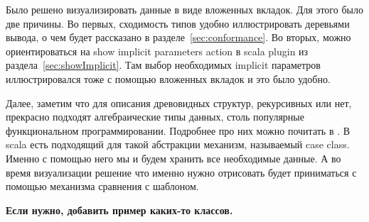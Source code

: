 Было решено визуализировать данные в виде вложенных вкладок.
Для этого было две причины.
Во первых, сходимость типов удобно иллюстрировать деревьями вывода,
о чем будет рассказано в разделе~\ref{sec:conformance}.
Во вторых, можно ориентироваться на show implicit parameters action
в scala plugin из раздела~\ref{sec:showImplicit}.
Там выбор необходимых implicit параметров иллюстрировался тоже с помощью
вложенных вкладок и это было удобно.

Далее, заметим что для описания древовидных структур, рекурсивных или нет,
прекрасно подходят алгебраические типы данных, столь популярные функциональном
программировании.
Подробнее про них можно почитать в \cite{algebraic_data}.
В scala есть подходящий для такой абстракции механизм, называемый case class.
Именно с помощью него мы и будем хранить все необходимые данные.
А во время визуализации решение что именно нужно отрисовать будет приниматься
с помощью механизма сравнения с шаблоном.

\textbf{Если нужно, добавить пример каких-то классов.}
